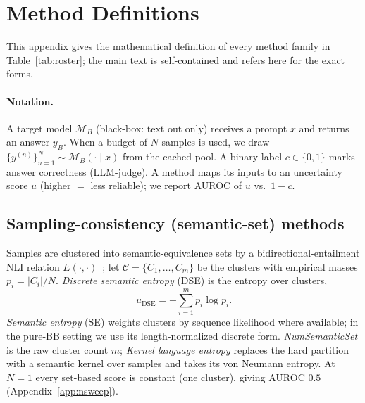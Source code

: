 \documentclass[11pt]{article}
\begin{document}



\appendix

\section{Method Definitions}\label{app:methods}
This appendix gives the mathematical definition of every method family in
Table~\ref{tab:roster}; the main text is self-contained and refers here for the exact forms.

\paragraph{Notation.} A target model $\mathcal{M}_B$ (black-box: text out only) receives a
prompt $x$ and returns an answer $y_B$. When a budget of $N$ samples is used, we draw
$\{y^{(n)}\}_{n=1}^{N}\sim \mathcal{M}_B(\cdot\mid x)$ from the cached pool. A binary label
$c\in\{0,1\}$ marks answer correctness (LLM-judge). A method maps its inputs to an
uncertainty score $u$ (higher $=$ less reliable); we report AUROC of $u$ vs.\ $1-c$.

\subsection{Sampling-consistency (semantic-set) methods}
Samples are clustered into semantic-equivalence sets by a bidirectional-entailment NLI
relation $E(\cdot,\cdot)$~\citep{kuhn2023semantic,farquhar2024detecting}; let $\mathcal{C}=
\{C_1,\dots,C_m\}$ be the clusters with empirical masses $p_i=|C_i|/N$.
\emph{Discrete semantic entropy} (DSE) is the entropy over clusters,
\begin{equation}
u_{\mathrm{DSE}} = -\sum_{i=1}^{m} p_i \log p_i .
\end{equation}
\emph{Semantic entropy} (SE) weights clusters by sequence likelihood where available; in the
pure-BB setting we use its length-normalized discrete form. \emph{NumSemanticSet} is the raw
cluster count $m$; \emph{Kernel language entropy} replaces the hard partition with a
semantic kernel over samples and takes its von Neumann entropy. At $N{=}1$ every set-based
score is constant (one cluster), giving AUROC $0.5$ (Appendix~\ref{app:nsweep}).
\end{document}
